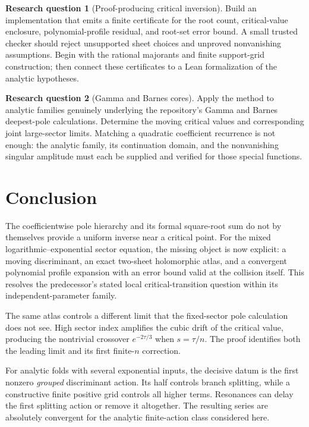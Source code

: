 \documentclass[11pt,a4paper]{article}
\theoremstyle{definition}
\newtheorem{question}{Research question}[section]
\theoremstyle{remark}
\begin{document}
\begin{question}[Proof-producing critical inversion]
Build an implementation that emits a finite certificate for the root
count, critical-value enclosure, polynomial-profile residual, and
root-set error bound. A small trusted checker should reject unsupported
sheet choices and unproved nonvanishing assumptions. Begin with the
rational majorants and finite support-grid construction; then connect
these certificates to a Lean formalization of the analytic hypotheses.
\end{question}

\begin{question}[Gamma and Barnes cores]
Apply the method to analytic families genuinely underlying the
repository's Gamma and Barnes deepest-pole calculations. Determine the
moving critical values and corresponding joint large-sector limits.
Matching a quadratic coefficient recurrence is not enough: the analytic
family, its continuation domain, and the nonvanishing singular amplitude
must each be supplied and verified for those special functions.
\end{question}

\section{Conclusion}
The coefficientwise pole hierarchy and its formal square-root sum do
not by themselves provide a uniform inverse near a critical point.
For the mixed logarithmic--exponential sector equation, the missing
object is now explicit: a moving discriminant, an exact two-sheet
holomorphic atlas, and a convergent polynomial profile expansion with an
error bound valid at the collision itself. This resolves the predecessor's
stated local critical-transition question within its independent-parameter
family.

The same atlas controls a different limit that the fixed-sector pole
calculation does not see. High sector index amplifies the cubic drift of
the critical value, producing the nontrivial crossover
$e^{-2\tau/3}$ when $s=\tau/n$. The proof identifies both the leading
limit and its first finite-$n$ correction.

For analytic folds with several exponential inputs, the decisive datum
is the first nonzero \emph{grouped} discriminant action. Its half controls
branch splitting, while a constructive finite positive grid controls all
higher terms. Resonances can delay the first splitting action or remove
it altogether. The resulting series are absolutely convergent for the
analytic finite-action class considered here.
\end{document}
